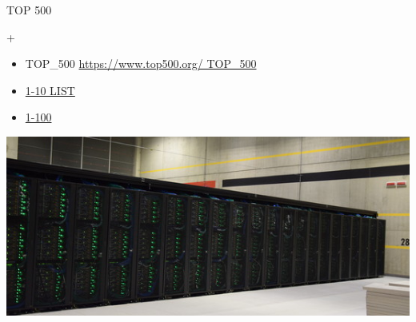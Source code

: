 \documentclass[ignorenonframetext,]{beamer}
\providecommand{\tightlist}{%
  \setlength{\itemsep}{0pt}\setlength{\parskip}{0pt}}
\begin{document}
\begin{frame}{TOP 500}

+

\begin{itemize}
\tightlist
\item
  TOP\_500 \href{https://www.top500.org/}{https://www.top500.org/
  TOP\_500}
\item
  \href{https://www.top500.org/lists/2018/11/}{1-10 LIST}
\item
  \href{https://www.top500.org/list/2018/11/?page=1}{1-100}
\end{itemize}


\href{https://www.eni.com/it_IT/innovazione/piattaforme-tecnologiche/aumento-recupero-idrocarburi/hpc.page}{\includegraphics{images/HPC4-ENI.jpg}}

\end{frame}
\end{document}

